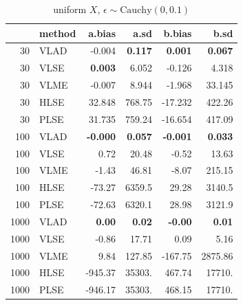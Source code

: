 \documentclass[twoside]{article}
\begin{document}
\begin{table}[ht]
\centering
\caption{uniform $X$, $\epsilon \sim \mathrm{Cauchy}(0,0.1)$}
\begin{tabular}{rlrrrr}
  \hline
 & method & a.bias & a.sd & b.bias & b.sd \\ 
  \hline
  30 & VLAD & -0.004 & \textbf{0.117} & \textbf{0.001} & \textbf{0.067 }\\ 
  30 & VLSE & \textbf{0.003} & 6.052 & -0.126 & 4.318 \\ 
  30 & VLME & -0.007 & 8.944 & -1.968 & 33.145 \\ 
  30 & HLSE & 32.848 & 768.75 & -17.232 & 422.26 \\ 
  30 & PLSE & 31.735 & 759.24 & -16.654 & 417.09 \\ 
  \hline
  100 & VLAD & \textbf{-0.000} & \textbf{0.057} & \textbf{-0.001} & \textbf{0.033} \\ 
  100 & VLSE & 0.72 & 20.48 & -0.52 & 13.63 \\ 
  100 & VLME & -1.43 & 46.81 & -8.07 & 215.15 \\ 
  100 & HLSE & -73.27 & 6359.5 & 29.28 & 3140.5 \\ 
  100 & PLSE & -72.63 & 6320.1 & 28.98 & 3121.9 \\ 
  \hline
  1000 & VLAD & \textbf{0.00} & \textbf{0.02} & \textbf{-0.00} & \textbf{0.01} \\ 
  1000 & VLSE & -0.86 & 17.71 & 0.09 & 5.16 \\ 
  1000 & VLME & 9.84 & 127.85 & -167.75 & 2875.86 \\ 
  1000 & HLSE & -945.37 & 35303. & 467.74 & 17710. \\ 
  1000 & PLSE & -946.17 & 35303. & 468.15 & 17710. \\ 
  \hline
\end{tabular}
\end{table}
\end{document}
